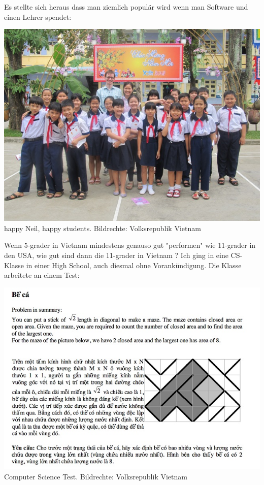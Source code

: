 Es stellte sich heraus dass man ziemlich populär wird wenn man Software und einen Lehrer spendet:
\begin{center}
\includegraphics[width=\linewidth]{vietnam/vietnam_happy.jpg}
\footnotesize{happy Neil, happy students. Bildrechte: Volksrepublik Vietnam}
\end{center}

Wenn 5-grader in Vietnam mindestens genauso gut "performen" wie 11-grader in den USA, wie gut sind dann die 11-grader in Vietnam ? Ich ging in eine CS-Klasse in einer High School, auch diesmal ohne Vorankündigung. Die Klasse arbeitete an einem Test:

\begin{center}
\includegraphics[width=\linewidth]{vietnam/vietnam_test.jpg}
\footnotesize{Computer Science Test. Bildrechte: Volksrepublik Vietnam}
\end{center}

